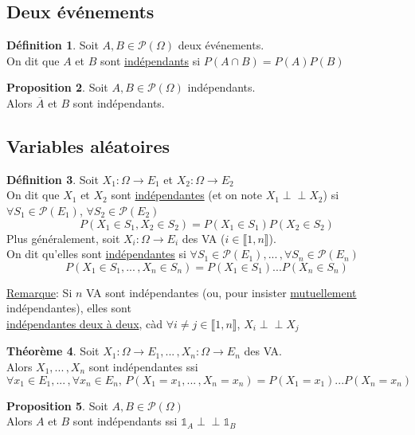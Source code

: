 \documentclass[10pt,a4paper]{article}
\theoremstyle{definition}
\newtheorem{proposition}{Proposition}[section]
\newtheorem{theorem}[proposition]{Théorème}
\newtheorem{definition}[proposition]{Définition}
\newcommand{\indep}{\mathrel{\perp \!\!\! \perp}}
\begin{document}
\subsection{Deux événements}
\begin{definition}
Soit $A, B \in \mathcal{P}(\Omega)$ deux événements. \\
On dit que $A$ et $B$ sont \uline{indépendants} si $P(A \cap B) = P(A) P(B)$
\end{definition}
\begin{proposition}
Soit $A, B \in \mathcal{P}(\Omega)$ indépendants. \\
Alors $\overline{A}$ et $B$ sont indépendants.
\end{proposition}

\subsection{Variables aléatoires}
\begin{definition}
Soit $X_1: \Omega \to E_1$ et $X_2: \Omega \to E_2$ \\
On dit que $X_1$ et $X_2$ sont \uline{indépendantes} (et on note $X_1 \indep X_2$) si $\forall S_1 \in \mathcal{P}(E_1)$, $\forall S_2 \in \mathcal{P}(E_2)$
\[ P(X_1 \in S_1, X_2 \in S_2) = P(X_1 \in S_1) P(X_2 \in S_2) \]
Plus généralement, soit $X_i: \Omega \to E_i$ des VA ($i \in \llbracket 1, n \rrbracket$). \\
On dit qu'elles sont \uline{indépendantes} si $\forall S_1 \in \mathcal{P}(E_1), ...\,, \forall S_n \in \mathcal{P}(E_n)$
\[ P(X_1 \in S_1, ...\,, X_n \in S_n) = P(X_1 \in S_1) ... P(X_n \in S_n) \]
\end{definition}
\noindent \uline{Remarque}: Si $n$ VA sont indépendantes (ou, pour insister \uline{mutuellement} indépendantes), elles sont \\
\uline{indépendantes deux à deux}, càd $\forall i \neq j \in \llbracket 1, n \rrbracket$, $X_i \indep X_j$
\begin{theorem}
Soit $X_1: \Omega \to E_1, ...\,, X_n: \Omega \to E_n$ des VA. \\
Alors $X_1, ...\,, X_n$ sont indépendantes ssi
\[ \forall x_1 \in E_1, ...\,, \forall x_n \in E_n,\, P(X_1 = x_1, ...\,, X_n = x_n) = P(X_1 = x_1) ... P(X_n = x_n) \]
\end{theorem}
\begin{proposition}
Soit $A, B \in \mathcal{P}(\Omega)$ \\
Alors $A$ et $B$ sont indépendants ssi $\mathds{1}_A \indep \mathds{1}_B$
\end{proposition}
\end{document}
